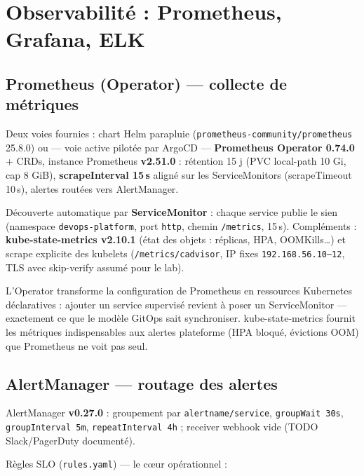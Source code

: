 \documentclass[11pt,a4paper]{article}
\begin{document}
\clearpage

\section{Observabilité : Prometheus, Grafana, ELK}

\subsection{Prometheus (Operator) --- collecte de métriques}
Deux voies fournies : chart Helm parapluie (\texttt{prometheus-community/prometheus} 25.8.0) ou --- voie active pilotée par ArgoCD --- \textbf{Prometheus Operator 0.74.0} + CRDs, instance Prometheus \textbf{v2.51.0} : rétention 15 j (PVC local-path 10 Gi, cap 8 GiB), \textbf{scrapeInterval 15\,s} aligné sur les ServiceMonitors (scrapeTimeout 10\,s), alertes routées vers AlertManager.

Découverte automatique par \textbf{ServiceMonitor} : chaque service publie le sien (namespace \texttt{devops-platform}, port \texttt{http}, chemin \texttt{/metrics}, 15\,s). Compléments : \textbf{kube-state-metrics v2.10.1} (état des objets : réplicas, HPA, OOMKills\ldots) et scrape explicite des kubelets (\texttt{/metrics/cadvisor}, IP fixes \texttt{192.168.56.10--12}, TLS avec skip-verify assumé pour le lab).

\begin{whybox}
L'Operator transforme la configuration de Prometheus en ressources Kubernetes déclaratives : ajouter un service supervisé revient à poser un ServiceMonitor --- exactement ce que le modèle GitOps sait synchroniser. kube-state-metrics fournit les métriques indispensables aux alertes plateforme (HPA bloqué, évictions OOM) que Prometheus ne voit pas seul.
\end{whybox}

\subsection{AlertManager --- routage des alertes}
AlertManager \textbf{v0.27.0} : groupement par \texttt{alertname/service}, \texttt{groupWait 30s}, \texttt{groupInterval 5m}, \texttt{repeatInterval 4h} ; receiver webhook vide (TODO Slack/PagerDuty documenté).

Règles SLO (\texttt{rules.yaml}) --- le cœur opérationnel :
\end{document}
